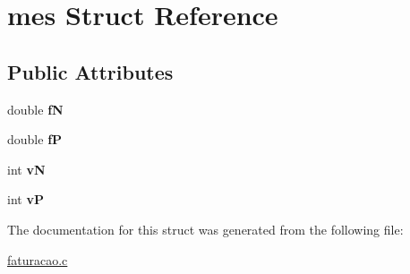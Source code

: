 \hypertarget{structmes}{}\section{mes Struct Reference}
\label{structmes}
\subsection*{Public Attributes}
\begin{DoxyCompactItemize}
\item 
\mbox{\label{structmes_a233faa087acc8274fc2fcd060537c50f}} 
double {\bfseries fN}
\item 
\mbox{\label{structmes_a1dd8217f43e6fafe71da4535dc5c824c}} 
double {\bfseries fP}
\item 
\mbox{\label{structmes_a65f04ca66c4b34316e8ba88271ec2884}} 
int {\bfseries vN}
\item 
\mbox{\label{structmes_a42ca395167be0938b11b7712804418d5}} 
int {\bfseries vP}
\end{DoxyCompactItemize}


The documentation for this struct was generated from the following file\+:\begin{DoxyCompactItemize}
\item 
\hyperlink{faturacao_8c}{faturacao.\+c}\end{DoxyCompactItemize}
